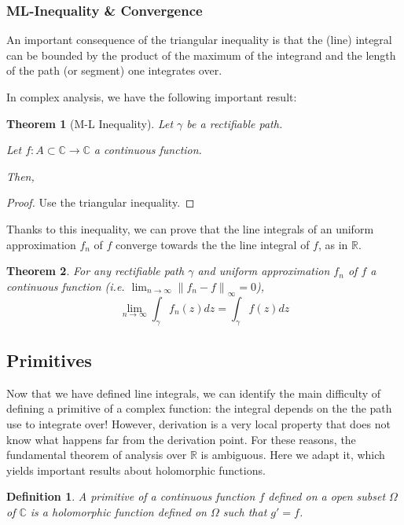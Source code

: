 \documentclass{article}
\newtheorem*{defi}{Definition}
\newtheorem*{thm*}{Theorem}
\begin{document}
\subsubsection{ML-Inequality \& Convergence}

An important consequence of the triangular inequality is that the (line) integral can be bounded by the product of the maximum of the integrand and the length of the path (or segment) one integrates over.

In complex analysis, we have the following important result:

\begin{thm*}[M-L Inequality]
    Let $\gamma$ be a rectifiable path.

    Let $f: A\subset\mathbb{C} \rightarrow \mathbb{C}$ a continuous function.

    Then, 
\end{thm*}

\begin{proof}
    Use the triangular inequality.
\end{proof}

Thanks to this inequality, we can prove that the line integrals of an uniform approximation $f_n$ of $f$ converge towards the the line integral of $f$, as in $\mathbb{R}$.

\begin{thm*}
    For any rectifiable path $\gamma$ and uniform approximation $f_n$ of $f$ a continuous function (i.e. $\lim_{n\rightarrow \infty}\left\| f_n -f \right \|_{\infty} = 0$), 
    $$ \lim_{n\rightarrow\infty} \int_\gamma f_n(z)dz = \int_\gamma f(z)dz $$
\end{thm*}

\subsection{Primitives}

Now that we have defined line integrals, we can identify the main difficulty of defining a primitive of a complex function: the integral depends on the the path use to integrate over! However, derivation is a very local property that does not know what happens far from the derivation point. For these reasons, the fundamental theorem of analysis over $\mathbb{R}$ is ambiguous. Here we adapt it, which yields important results about holomorphic functions.

\begin{defi}
    A primitive of a continuous function $f$ defined on a open subset $\Omega$ of $\mathbb{C}$ is a holomorphic function defined on $\Omega$ such that $g'=f$.
\end{defi}
\end{document}
